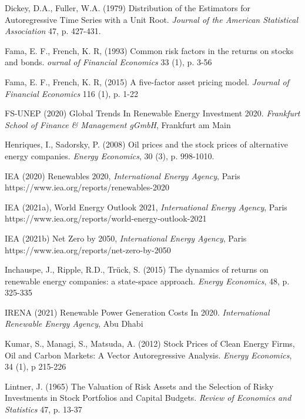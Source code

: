 \documentclass[11pt]{article}
\begin{document}
Dickey, D.A., Fuller, W.A. (1979) Distribution of the Estimators for Autoregressive Time Series with a Unit Root. \textit{Journal of the American Statistical Association} 47, p. 427-431.
\newline

Fama, E. F., French, K. R, (1993) Common risk factors in the returns on stocks and bonds. \textit{ournal of Financial Economics} 33 (1), p. 3-56
\newline

Fama, E. F., French, K. R, (2015) A five-factor asset pricing model. \textit{Journal of Financial Economics} 116 (1), p. 1-22
\newline

FS-UNEP (2020) Global Trends In Renewable Energy Investment 2020. \textit{Frankfurt School of Finance \& Management gGmbH}, Frankfurt am Main
\newline

Henriques, I., Sadorsky, P. (2008) Oil prices and the stock prices of alternative energy companies. \textit{Energy Economics}, 30 (3), p. 998-1010.
\newline

IEA (2020) Renewables 2020, \textit{International Energy Agency}, Paris https://www.iea.org/reports/renewables-2020
\newline

IEA (2021a), World Energy Outlook 2021, \textit{International Energy Agency}, Paris https://www.iea.org/reports/world-energy-outlook-2021

IEA (2021b) Net Zero by 2050, \textit{International Energy Agency}, Paris https://www.iea.org/reports/net-zero-by-2050
\newline

Inchauspe, J., Ripple, R.D., Trück, S. (2015) The dynamics of returns on renewable energy companies: a state-space approach. \textit{Energy Economics}, 48, p. 325-335
\newline

IRENA (2021) Renewable Power Generation Costs In 2020. \textit{International Renewable Energy Agency}, Abu Dhabi
\newline

Kumar, S., Managi, S., Matsuda, A. (2012) Stock Prices of Clean Energy Firms, Oil and
Carbon Markets: A Vector Autoregressive Analysis. \textit{Energy Economics}, 34 (1), p 215-226
\newline

Lintner, J. (1965) The Valuation of Risk Assets and the Selection of Risky Investments in Stock Portfolios and Capital Budgets. \textit{Review of Economics and Statistics} 47, p. 13-37
\newline
\end{document}
